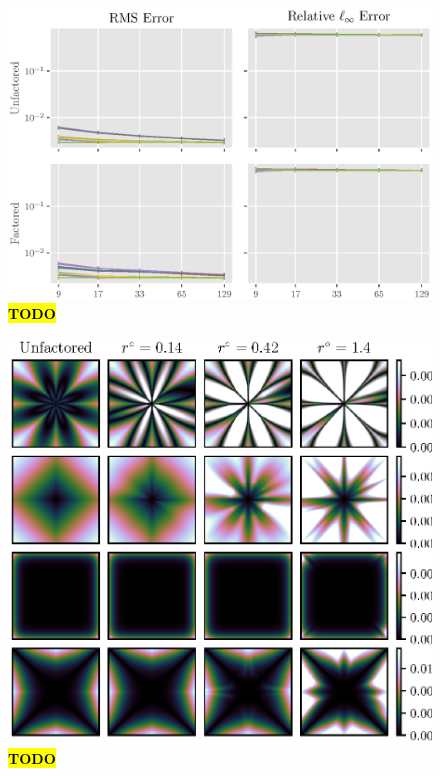 \documentclass[sisc-eikonal.tex]{subfiles}
\begin{document}
\begin{figure}[H]
  \centering
  \includegraphics[width=\linewidth]{qv_plots_3d.eps}
  \caption{\hl{\textbf{TODO}}}
\end{figure}

\begin{figure}[H]
  \centering
  \includegraphics[width=\linewidth]{factoring_comparison_plots.eps}
  \caption{\hl{\textbf{TODO}}}
\end{figure}
\end{document}
